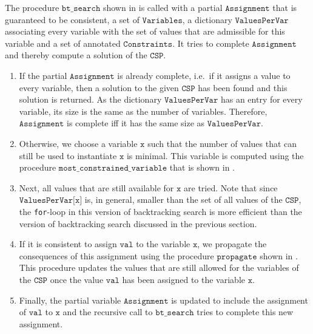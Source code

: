 The procedure $\texttt{bt\_search}$ shown in  is called with a
partial $\texttt{Assignment}$ that is guaranteed to be consistent, a set of $\texttt{Variables}$, a dictionary
$\texttt{ValuesPerVar}$ associating every variable with the set of values that are admissible for this variable and a
set of annotated $\texttt{Constraints}$.  It tries to complete $\texttt{Assignment}$ and thereby compute a
solution of the $\texttt{CSP}$.  
\begin{enumerate}
\item If the partial $\texttt{Assignment}$ is already complete, i.e.~if it assigns a value to every variable, 
      then a solution to the given $\texttt{CSP}$ has been found and this solution is returned.  As the
      dictionary $\mathtt{ValuesPerVar}$ has an entry for every variable, its size is the same as the number of
      variables. Therefore, $\mathtt{Assignment}$ is complete iff it has the same size as $\mathtt{ValuesPerVar}$.
\item Otherwise, we choose a variable $\texttt{x}$ such that the number of values that can still be used to
      instantiate $\texttt{x}$ is minimal.  This variable is computed using the procedure
      $\texttt{most\_constrained\_variable}$ that is shown in .
\item Next, all values that are still available for $\texttt{x}$ are tried.  Note that since
      $\texttt{ValuesPerVar[x]}$ is, in general, smaller than the set of all values of the $\texttt{CSP}$,
      the \texttt{for}-loop in this version of backtracking search is more efficient than the version of
      backtracking search discussed in the previous section. 
\item If it is consistent to assign $\texttt{val}$ to the variable $\texttt{x}$, we propagate the consequences
      of this assignment using the procedure $\texttt{propagate}$ shown in
      .
      This procedure updates the values that are still allowed for the variables of the $\texttt{CSP}$ once the
      value $\texttt{val}$ has been assigned to the variable $\texttt{x}$.
\item Finally, the partial variable $\texttt{Assignment}$ is updated to include the assignment of 
      $\texttt{val}$ to $\texttt{x}$ and the recursive call to $\texttt{bt\_search}$ tries to complete this new
      assignment. 
\end{enumerate}

